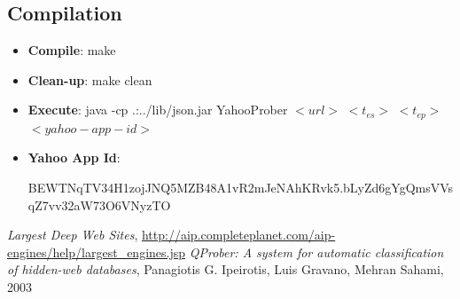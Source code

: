 \documentclass[11pt]{article}
\begin{document}
\subsection* {Compilation}
\begin{itemize}
\item \textbf{Compile}: make 
\item \textbf{Clean-up}: make clean 
\item\textbf{Execute}: java -cp .:../lib/json.jar  YahooProber $<url>$ $<t_{es}>$ $<t_{ep}>$ $<yahoo-app-id>$
\item \textbf{Yahoo App Id}: 

BEWTNqTV34H1zojJNQ5MZB48A1vR2mJeNAhKRvk5.bLyZd6gYgQmsVVsqZ7vv32aW73O6VNyzTO
\end{itemize}


\begin{thebibliography}{50}
		 \textit{Largest Deep Web Sites}, \url{http://aip.completeplanet.com/aip-engines/help/largest_engines.jsp}
		 \textit{QProber: A system for automatic classification of hidden-web databases}, Panagiotis G. Ipeirotis,  Luis Gravano,  Mehran Sahami, 2003
\end{thebibliography}
\end{document}
